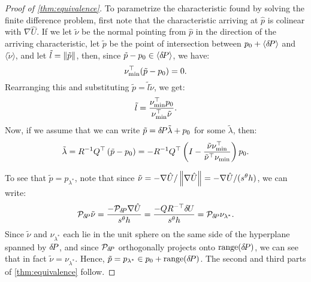 \documentclass[sisc-eikonal.tex]{subfiles}
\begin{document}
\begin{proof}[Proof of \cref{thm:equivalence}]
  To parametrize the characteristic found by solving the finite
  difference problem, first note that the characteristic arriving at
  $\hat{p}$ is colinear with $\nabla \hat{U}$. If we let $\tilde{\nu}$
  be the normal pointing from $\hat{p}$ in the direction of the
  arriving characteristic, let $\tilde{p}$ be the point of
  intersection between $p_0 + \langle {\delta \hspace{-0.14em} P} \rangle$ and
  $\langle \tilde{\nu} \rangle$, and let
  $\tilde{l} = \left\|\tilde{p}\right\|$, then, since
  $\tilde{p} - p_0 \in \langle {\delta \hspace{-0.14em} P} \rangle$, we have:
  \begin{equation}
    \nu_{\operatorname{min}}^\top (\tilde{p} - p_0) = 0.
  \end{equation}
  Rearranging this and substituting
  $\tilde{p} = \tilde{l} \tilde{\nu}$, we get:
  \begin{equation}
    \tilde{l} = \frac{\nu_{\operatorname{min}}^\top p_0}{\nu_{\operatorname{min}}^\top \tilde{\nu}}.
  \end{equation}
  Now, if we assume that we can write
  $\tilde{p} = {\delta \hspace{-0.14em} P} \tilde{\lambda} + p_0$ for some
  $\tilde{\lambda}$, then:
  \begin{equation}
    \tilde{\lambda} = R^{-1} Q^\top \left(\tilde{p} - p_0\right) = -R^{-1} Q^\top \left(I - \frac{\tilde{\nu} \nu_{\operatorname{min}}^\top}{\tilde{\nu}^\top \nu_{\operatorname{min}}}\right) p_0.
  \end{equation}

  To see that $\tilde{p} = p_{\lambda^*}$, note that since
  $\tilde{\nu} = -\nabla \hat{U}/\left\|\nabla \hat{U}\right\| = -\nabla
  \hat{U}/(s^\theta h)$, we can write:
  \begin{equation}
    \mathcal{P}_{{\delta \hspace{-0.14em} P}} \tilde{\nu} = \frac{-\mathcal{P}_{{\delta \hspace{-0.14em} P}} \nabla \hat{U}}{s^\theta h} = \frac{-QR^{-\top} {\delta \hspace{-0.09em} U}}{s^\theta h} = \mathcal{P}_{{\delta \hspace{-0.14em} P}} \nu_{\lambda^*}.
  \end{equation}
  Since $\tilde{\nu}$ and $\nu_{\lambda^*}$ each lie in the unit
  sphere on the same side of the hyperplane spanned by ${\delta \hspace{-0.14em} P}$, and
  since $\mathcal{P}_{{\delta \hspace{-0.14em} P}}$ orthogonally projects onto
  $\operatorname{range}({\delta \hspace{-0.14em} P})$, we can see that in fact
  $\tilde{\nu} = \nu_{\lambda^*}$. Hence,
  $\tilde{p} = p_{\lambda^*} \in p_0 + \operatorname{range}({\delta \hspace{-0.14em} P})$. The second
  and third parts of \cref{thm:equivalence} follow.
\end{proof}
\end{document}
